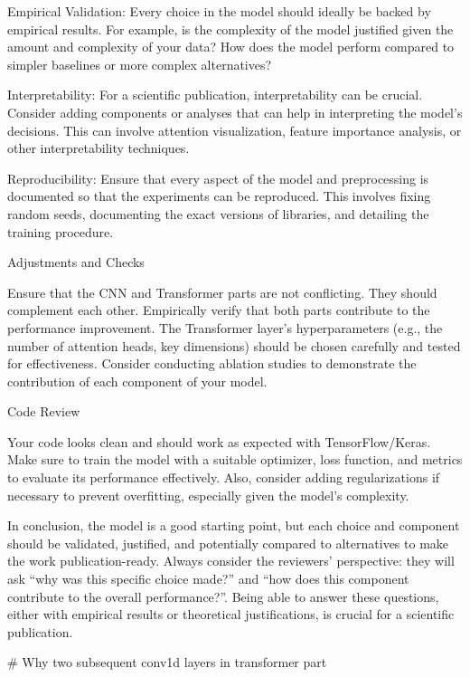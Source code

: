     Empirical Validation:
        Every choice in the model should ideally be backed by empirical results. For example, is the complexity of the model justified given the amount and complexity of your data? How does the model perform compared to simpler baselines or more complex alternatives?

    Interpretability:
        For a scientific publication, interpretability can be crucial. Consider adding components or analyses that can help in interpreting the model's decisions. This can involve attention visualization, feature importance analysis, or other interpretability techniques.

    Reproducibility:
        Ensure that every aspect of the model and preprocessing is documented so that the experiments can be reproduced. This involves fixing random seeds, documenting the exact versions of libraries, and detailing the training procedure.

Adjustments and Checks

    Ensure that the CNN and Transformer parts are not conflicting. They should complement each other. Empirically verify that both parts contribute to the performance improvement.
    The Transformer layer's hyperparameters (e.g., the number of attention heads, key dimensions) should be chosen carefully and tested for effectiveness.
    Consider conducting ablation studies to demonstrate the contribution of each component of your model.

Code Review

Your code looks clean and should work as expected with TensorFlow/Keras. Make sure to train the model with a suitable optimizer, loss function, and metrics to evaluate its performance effectively. Also, consider adding regularizations if necessary to prevent overfitting, especially given the model's complexity.

In conclusion, the model is a good starting point, but each choice and component should be validated, justified, and potentially compared to alternatives to make the work publication-ready. Always consider the reviewers’ perspective: they will ask “why was this specific choice made?” and “how does this component contribute to the overall performance?”. Being able to answer these questions, either with empirical results or theoretical justifications, is crucial for a scientific publication.






# Why two subsequent conv1d layers in transformer part

